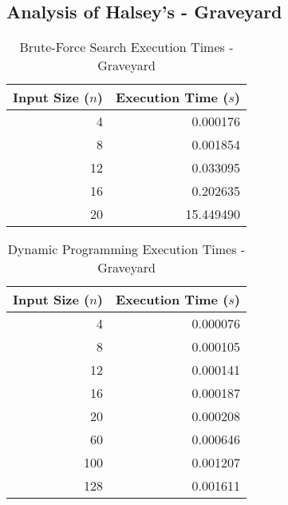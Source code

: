 \documentclass[conference]{IEEEtran}
\begin{document}
\subsection{Analysis of Halsey's - Graveyard}
\begin{table}[H]
    \centering 
    \caption{Brute-Force Search Execution Times - Graveyard}
    \renewcommand{\arraystretch}{1.2} %
    \setlength{\tabcolsep}{3pt} %
    \begin{tabular}{r r}
        \toprule 
        \textbf{Input Size ($n$)} & \textbf{Execution Time ($s$)} \\
        \midrule 
        4 & 0.000176 \\
        8 & 0.001854 \\
        12 & 0.033095\\
        16 & 0.202635 \\
        20 & 15.449490 \\
        \bottomrule
    \end{tabular}
\end{table}
\begin{table}[H]
    \centering
    \caption{Dynamic Programming Execution Times - Graveyard}
    \renewcommand{\arraystretch}{1.2} %
    \setlength{\tabcolsep}{3pt} %
    \begin{tabular}{r r}
        \toprule 
        \textbf{Input Size ($n$)} & \textbf{Execution Time ($s$)} \\
        \midrule 
        4 & 0.000076 \\ 
        8 & 0.000105 \\
        12 & 0.000141 \\
        16 & 0.000187 \\
        20 & 0.000208 \\
        60 & 0.000646 \\
        100 & 0.001207 \\
        128 & 0.001611 \\
        \bottomrule
    \end{tabular}
\end{table}
\end{document}
